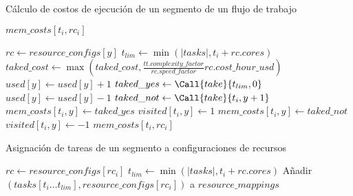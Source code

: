 \begin{algorithm}
\caption{C\'alculo de costos de ejecución de un segmento de un flujo de trabajo}
\label{alg_blind_take}
\begin{algorithmic}[1]
	\EndIf
		\State \Return $mem\_costs[t_i, rc_i]$
	\EndIf

		\State $rc \gets resource\_configs[y]$
		\State $t_{lim} \gets \min(|tasks|, t_i + rc.cores)$ 
		 
			\State $taked\_cost \gets \max(taked\_cost, \frac{tt.complexity\_factor}{rc.speed\_factor} rc.cost\_hour\_usd)$
		\EndFor
		\State $used[y] \gets used[y] + 1$
		\State $taked\_yes \gets \Call{take}{t_{lim}, 0}$
		\State $used[y] \gets used[y] - 1$
		\State $taked\_not \gets \Call{take}{t_i, y + 1}$
			\State $mem\_costs[t_i, y] \gets taked\_yes$
			\State $visited[t_i, y] \gets 1$
		\Else
			\State $mem\_costs[t_i, y] \gets taked\_not$
			\State $visited[t_i, y] \gets -1$
		\EndIf
	\EndFor
	\State \Return $mem\_costs[t_i, rc_i]$
\EndProcedure
\end{algorithmic}
\end{algorithm}



\begin{algorithm}
\caption{Asignación de tareas de un segmento a configuraciones de recursos}
\label{alg_blind_check_take}
\begin{algorithmic}[1]
			\State $rc \gets resource\_configs[rc_i]$
			\State $t_{lim} \gets \min(|tasks|, t_i + rc.cores)$
			\State Añadir $(tasks[t_i \dots t_{lim}], resource\_configs[rc_i])$ a $resource\_mappings$
			\State {}
			\State {}	
		\EndIf
	\EndIf
\EndProcedure
\end{algorithmic}
\end{algorithm}
